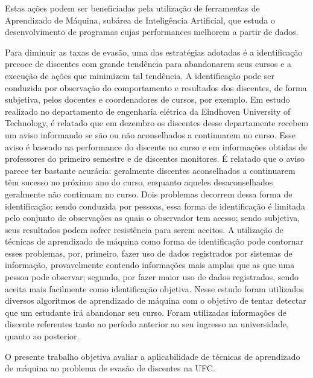 Estas ações podem ser beneficiadas pela utilização de ferramentas de Aprendizado de Máquina, subárea de Inteligência Artificial, que estuda o desenvolvimento de programas cujas performances melhorem a partir de dados. 


Para diminuir as taxas de evasão, uma das estratégias adotadas é a identificação precoce de discentes com grande tendência para abandonarem seus cursos e a execução de ações que minimizem tal tendência. A identificação pode ser conduzida por observação do comportamento e resultados dos discentes, de forma subjetiva, pelos docentes e coordenadores de cursos, por exemplo. Em estudo realizado no departamento de engenharia elétrica da Eindhoven University of Technology\cite{Predicting_Students}, é relatado que em dezembro os discentes desse departamente recebem um aviso informando se são ou não aconselhados a continuarem no curso. Esse aviso é baseado na performance do discente no curso e em informações obtidas de professores do primeiro semestre e de discentes monitores. É relatado que o aviso parece ter bastante acurácia: geralmente discentes aconselhados a continuarem têm sucesso no próximo ano do curso, enquanto aqueles desaconselhados geralmente não continuam no curso.
Dois problemas decorrem dessa forma de identificação: sendo conduzida por pessoas, essa forma de identificação é limitada pelo conjunto de observações as quais o observador tem acesso; sendo subjetiva, seus resultados podem sofrer resistência para serem aceitos. A utilização de técnicas de aprendizado de máquina como forma de identificação pode contornar esses problemas, por, primeiro, fazer uso de dados registrados por sistemas de informação, provavelmente contendo informações mais amplas que as que uma pessoa pode observar; segundo, por fazer maior uso de dados registrados, sendo aceita mais facilmente como identificação objetiva. Nesse estudo foram utilizados diversos algoritmos de aprendizado de máquina com o objetivo de tentar detectar que um estudante irá abandonar seu curso. Foram utilizadas informações de discente referentes tanto ao período anterior ao seu ingresso na universidade, quanto ao posterior.



O presente trabalho objetiva avaliar a aplicabilidade de técnicas de aprendizado de máquina ao problema de evasão de discentes na UFC.